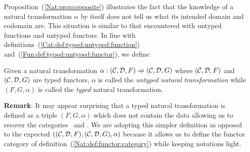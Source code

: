 Proposition~(\ref{Nat:prop:opposite}) illustrates the fact that the knowledge
of a natural transformation $\alpha$ by itself does not tell us what its 
intended domain and codomain are. This situation is similar to that encountered
with untyped functions and untyped functors. In line with
definitions~(\ref{Cat:def:typed:untyped:function}) 
and~(\ref{Fun:def:typed:untyped:functor}), we define:
\begin{defin}\label{Nat:def:typed:untyped:natural}
    Given a natural transformation $\alpha:(\mbox{$\cal C$},\mbox{$\cal D$},F)\Rightarrow(\mbox{$\cal C$},\mbox{$\cal D$},G)$
    where $(\mbox{$\cal C$},\mbox{$\cal D$},F)$ and $(\mbox{$\cal C$},\mbox{$\cal D$},G)$ are typed functors, $\alpha$ is 
    called the {\em untyped natural transformation} while
    $(F,G,\alpha)$ is called the {\em typed} natural transformation.
\end{defin}

\noindent
{\bf Remark}: It may appear surprising that a typed natural transformation is 
defined as a triple $(F,G,\alpha)$ which does not contain the data allowing 
us to recover the categories \Cat\ and \Dat. We are adopting this simpler
definition as opposed to the expected $((\mbox{$\cal C$},\mbox{$\cal D$},F),(\mbox{$\cal C$},\mbox{$\cal D$},G),\alpha)$
because it allows us to define the functor category of
definition~(\ref{Nat:def:functor:category}) while keeping notations light.


